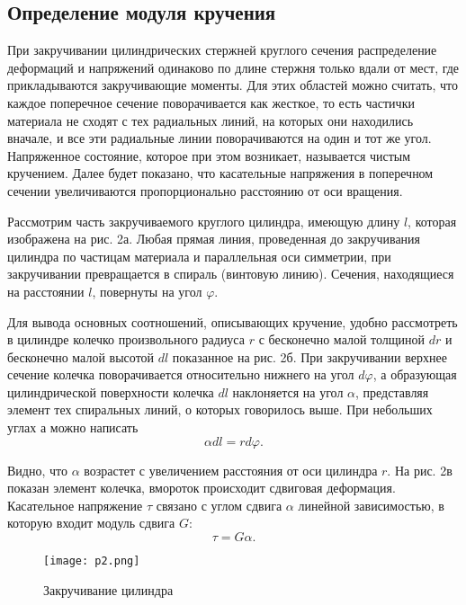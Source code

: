 \subsection{Определение модуля кручения}

При закручивании цилиндрических стержней круглого сечения
распределение деформаций и напряжений одинаково по длине
стержня только вдали от мест, где прикладываются закручивающие
моменты. Для этих областей можно считать, что каждое
поперечное сечение поворачивается как жесткое, то есть
частички материала не сходят с тех радиальных линий, на
которых они находились вначале, и все эти радиальные линии
поворачиваются на один и тот же угол. Напряженное состояние,
которое при этом возникает, называется чистым кручением. Далее
будет показано, что касательные напряжения в поперечном
сечении увеличиваются пропорционально расстоянию от оси
вращения.


Рассмотрим часть закручиваемого круглого цилиндра, имеющую
длину $l$, которая изображена на рис. 2а. Любая прямая линия,
проведенная до закручивания цилиндра по частицам материала и
параллельная оси симметрии, при закручивании превращается в
спираль (винтовую линию). Сечения, находящиеся на расстоянии
$l$, повернуты на угол $\varphi$.

Для вывода основных соотношений, описывающих кручение, удобно
рассмотреть в цилиндре колечко произвольного радиуса $r$ с
бесконечно малой толщиной $dr$ и бесконечно малой высотой $dl$
показанное на рис. 2б. При закручивании верхнее сечение
колечка поворачивается относительно нижнего на угол
$d\varphi$, а образующая цилиндрической поверхности колечка
$dl$ наклоняется на угол $\alpha$, представляя элемент тех
спиральных линий, о которых говорилось выше. При небольших
углах а можно написать
\begin{equation}
    \alpha dl = rd\varphi.
\end{equation}

Видно, что $\alpha$ возрастет с увеличением расстояния от оси
цилиндра $r$. На рис. 2в показан элемент колечка, вмороток
происходит сдвиговая деформация. Касательное напряжение $\tau$
связано с углом сдвига $\alpha$ линейной зависимостью, в
которую входит модуль сдвига $ G$:
\begin{equation}
    \tau = G\alpha.
\end{equation}
\begin{figure}[H]
    \centering
\texttt{[image: p2.png]}
    \caption{Закручивание цилиндра}
    \label{fig:my_label}
\end{figure}

